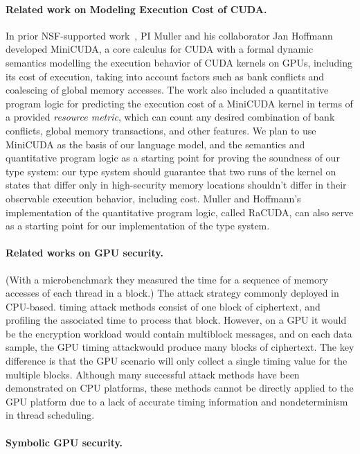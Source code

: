 \paragraph{Related work on Modeling Execution Cost of CUDA.}
In prior NSF-supported work~\cite{MullerHo21}, PI Muller and his collaborator Jan Hoffmann developed MiniCUDA, a core calculus for CUDA with a formal dynamic semantics modelling the execution behavior of CUDA kernels on GPUs, including its cost of execution, taking into account factors such as bank conflicts and coalescing of global memory accesses.
%
The work also included a quantitative program logic for predicting the execution cost of a MiniCUDA kernel in terms of a provided {\em resource metric}, which can count any desired combination of bank conflicts, global memory transactions, and other features.
%
We plan to use MiniCUDA as the basis of our language model, and the semantics and quantitative program logic as a starting point for proving the soundness of our type system: our type system should guarantee that two runs of the kernel on states that differ only in high-security memory locations shouldn't differ in their observable execution behavior, including cost.
%
Muller and Hoffmann's implementation of the quantitative program logic, called RaCUDA, can also serve as a starting point for our implementation of the type system.

\paragraph{Related works on GPU security.}
(With a microbenchmark they measured the
time for a sequence of memory accesses of each thread in a block.)
%
The attack strategy commonly deployed in CPU-based. timing attack methods consist of one block of ciphertext, and profiling the associated time to process that
block. However, on a GPU it would be the encryption workload would contain multiblock messages, and on each data sample, the GPU
timing attackwould produce many blocks of ciphertext.
The key difference is that the GPU scenario will only
collect a single timing value for the multiple blocks.
Although many successful attack methods have been
demonstrated on CPU platforms, these methods cannot be directly applied to the GPU platform due to a
lack of accurate timing information and nondeterminism in thread scheduling.

\paragraph{Symbolic GPU security.}


